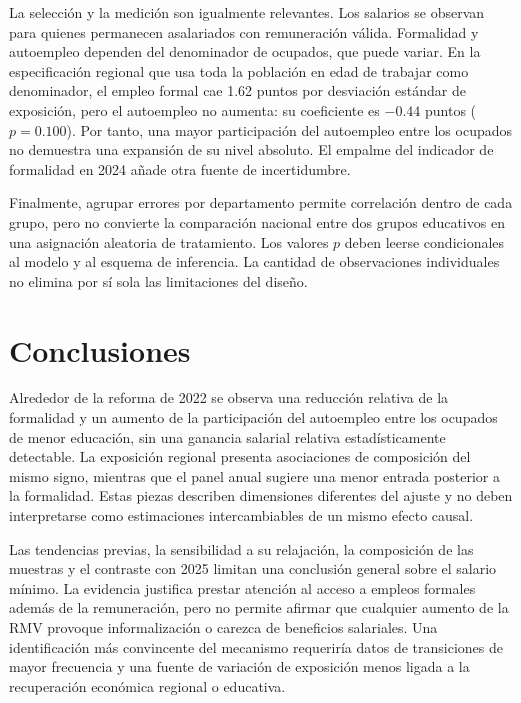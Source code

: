 La selección y la medición son igualmente relevantes. Los salarios se observan para quienes permanecen asalariados con remuneración válida. Formalidad y autoempleo dependen del denominador de ocupados, que puede variar. En la especificación regional que usa toda la población en edad de trabajar como denominador, el empleo formal cae 1.62 puntos por desviación estándar de exposición, pero el autoempleo no aumenta: su coeficiente es $-0.44$ puntos ($p=0.100$). Por tanto, una mayor participación del autoempleo entre los ocupados no demuestra una expansión de su nivel absoluto. El empalme del indicador de formalidad en 2024 añade otra fuente de incertidumbre.

Finalmente, agrupar errores por departamento permite correlación dentro de cada grupo, pero no convierte la comparación nacional entre dos grupos educativos en una asignación aleatoria de tratamiento. Los valores $p$ deben leerse condicionales al modelo y al esquema de inferencia. La cantidad de observaciones individuales no elimina por sí sola las limitaciones del diseño.

\section{Conclusiones}

Alrededor de la reforma de 2022 se observa una reducción relativa de la formalidad y un aumento de la participación del autoempleo entre los ocupados de menor educación, sin una ganancia salarial relativa estadísticamente detectable. La exposición regional presenta asociaciones de composición del mismo signo, mientras que el panel anual sugiere una menor entrada posterior a la formalidad. Estas piezas describen dimensiones diferentes del ajuste y no deben interpretarse como estimaciones intercambiables de un mismo efecto causal.

Las tendencias previas, la sensibilidad a su relajación, la composición de las muestras y el contraste con 2025 limitan una conclusión general sobre el salario mínimo. La evidencia justifica prestar atención al acceso a empleos formales además de la remuneración, pero no permite afirmar que cualquier aumento de la RMV provoque informalización o carezca de beneficios salariales. Una identificación más convincente del mecanismo requeriría datos de transiciones de mayor frecuencia y una fuente de variación de exposición menos ligada a la recuperación económica regional o educativa.
